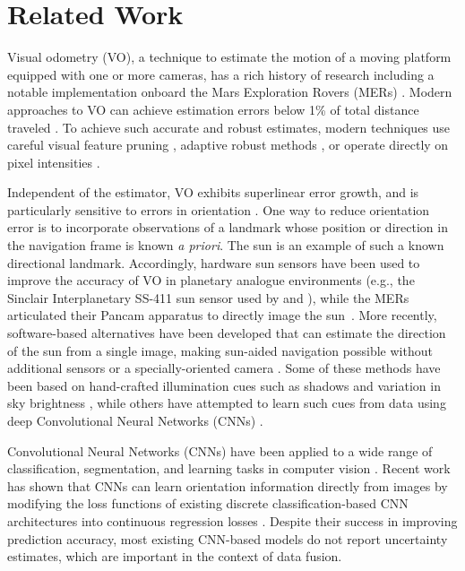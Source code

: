 \section{Related Work}

Visual odometry (VO), a technique to estimate the motion of a moving platform equipped with one or more cameras, has a rich history of research including a notable implementation onboard the Mars Exploration Rovers (MERs) \citep{Scaramuzza2011-qr}. 
Modern approaches to VO can achieve estimation errors below 1\% of total distance traveled  \citep{Geiger2013-ky}. 
To achieve such accurate and robust estimates, modern techniques use careful visual feature pruning \citep{Cvisic2015-mt}, adaptive robust methods  \citep{Alcantarilla2016-kv,Peretroukhin2016-om}, or operate directly on pixel intensities \citep{Engel2015-il}.

Independent of the estimator, VO exhibits superlinear error growth, and is particularly sensitive to errors in orientation \citep{Olson2003-ax, Cvisic2015-mt}. 
One way to reduce orientation error is to incorporate observations of a landmark whose position or direction in the navigation frame is known \emph{a priori}. 
The sun is an example of such a known directional landmark. 
Accordingly, hardware sun sensors have been used to improve the accuracy of VO in planetary analogue environments (e.g., the Sinclair Interplanetary SS-411 sun sensor used by \citet{Furgale2011-zu} and \citet{Lambert2012-sn}), while the MERs articulated their Pancam apparatus to directly image the sun~\citep{Maimone2007-tc,Eisenman2002-cg}. 
More recently, software-based alternatives have been developed that can estimate the direction of the sun from a single image, making sun-aided navigation possible without additional sensors or a specially-oriented camera \citep{2017_Clement_Improving}. 
Some of these methods have been based on hand-crafted illumination cues such as shadows and variation in sky brightness \citep{Lalonde2011-jw,2017_Clement_Improving}, while others have attempted to learn such cues from data using deep Convolutional Neural Networks (CNNs) \citep{Ma2016-at}.

Convolutional Neural Networks (CNNs) have been applied to a wide range of classification, segmentation, and learning tasks in computer vision \citep{LeCun2015-qf}. 
Recent work has shown that CNNs can learn orientation information directly from images by modifying the loss functions of existing discrete classification-based CNN architectures into continuous regression losses \citep{Ma2016-at, Kendall2015-ew, Kendall2016-zf}. 
Despite their success in improving prediction accuracy, most existing CNN-based models do not report uncertainty estimates, which are important in the context of data fusion.

